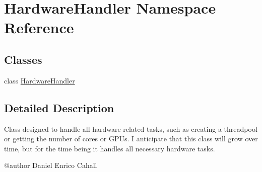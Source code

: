 \hypertarget{namespaceHardwareHandler}{}\section{Hardware\+Handler Namespace Reference}
\label{namespaceHardwareHandler}
\subsection*{Classes}
\begin{DoxyCompactItemize}
\item 
class \mbox{\hyperlink{classHardwareHandler_1_1HardwareHandler}{Hardware\+Handler}}
\end{DoxyCompactItemize}


\subsection{Detailed Description}
\begin{DoxyVerb}Class designed to handle all hardware related tasks, such as creating a threadpool or getting the number of cores or GPUs.
I anticipate that this class will grow over time, but for the time being it handles all necessary hardware tasks.

@author Daniel Enrico Cahall\end{DoxyVerb}
 